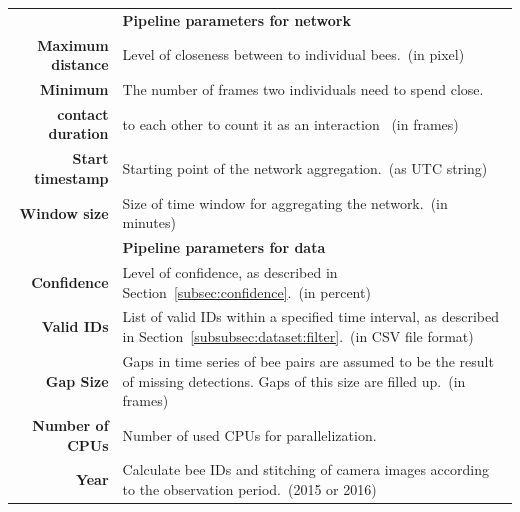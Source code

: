 \begin{table}[htbp]
\small
\centering
\begin{tabularx}{\textwidth}{@{} r Y @{}}
 & \normalsize\textbf{Pipeline parameters for network} \vspace{2mm} \\
\textbf{Maximum distance} & Level of closeness between to individual bees.~(in pixel) \vspace{2mm} \\
\textbf{Minimum} & The number of frames two individuals need to spend close.\\
\textbf{contact duration} &  to each other to count it as an interaction ~(in frames) \vspace{2mm} \\
\textbf{Start timestamp} & Starting point of the network aggregation.~(as UTC string) \vspace{2mm} \\
\textbf{Window size} & Size of time window for aggregating the network.~(in minutes) \vspace{10mm}\\
 & \normalsize\textbf{Pipeline parameters for data} \vspace{2mm} \\
\textbf{Confidence} & Level of confidence, as described in Section~\ref{subsec:confidence}.~(in percent) \vspace{2mm}\\
\textbf{Valid IDs} & List of valid IDs within a specified time interval, as described in Section~\ref{subsubsec:dataset:filter}.~(in CSV file format) \vspace{2mm}\\
\textbf{Gap Size} & Gaps in time series of bee pairs are assumed to be the result of missing detections. Gaps of this size are filled up.~(in frames)\vspace{2mm}\\
\textbf{Number of CPUs} & Number of used CPUs for parallelization. \vspace{2mm}\\
\textbf{Year} & Calculate bee IDs and stitching of camera images according to the observation period.~(2015 or 2016)\\
\end{tabularx}
\end{table}

